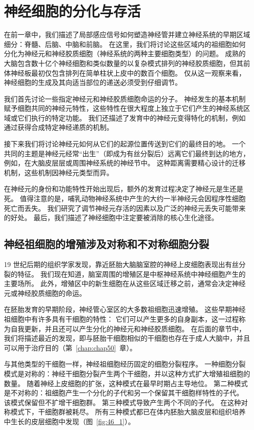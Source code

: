 \chapter{神经细胞的分化与存活} \label{chap:chap46}


在前一章中，我们描述了局部感应信号如何塑造神经管并建立神经系统的早期区域细分：脊髓、后脑、中脑和前脑。
在这里，我们将讨论这些区域内的祖细胞如何分化为神经元和神经胶质细胞（神经系统的两种主要细胞类型）的问题。
成熟的大脑包含数十亿个神经细胞和类似数量的以复杂模式排列的神经胶质细胞，但其前体神经板最初仅包含排列在简单柱状上皮中的数百个细胞。
仅从这一观察来看，神经细胞的生成及其向适当部位的递送必须受到仔细调节。


我们首先讨论一些指定神经元和神经胶质细胞命运的分子。
神经发生的基本机制赋予细胞共同的神经元特性，这些特性在很大程度上独立于它们产生的神经系统区域或它们执行的特定功能。
我们还描述了发育中的神经元变得特化的机制，例如通过获得合成特定神经递质的机制。


接下来我们将讨论神经元如何从它们的起源位置传送到它们的最终目的地。
一个共同的主题是神经元经常“出生”（即成为有丝分裂后）远离它们最终到达的地方，例如，在大脑皮层层或周围神经系统的神经节中。
这种距离需要精心设计的迁移机制，这些机制因神经元类型而异。




在神经元的身份和功能特性开始出现后，额外的发育过程决定了神经元是生还是死。
值得注意的是，哺乳动物神经系统中产生的大约一半神经元会因程序性细胞死亡而丢失。
我们研究了调节神经元存活的因素以及广泛的神经元丢失可能带来的好处。
最后，我们描述了神经细胞中注定要被消除的核心生化途径。



\section{神经祖细胞的增殖涉及对称和不对称细胞分裂}

19 世纪后期的组织学家发现，靠近胚胎大脑脑室腔的神经上皮细胞表现出有丝分裂的特征。
我们现在知道，脑室周围的增殖区是中枢神经系统中神经细胞产生的主要场所。
此外，增殖区中的新生细胞在从这些区域迁移之前，通常会决定神经元或神经胶质细胞的命运。


在胚胎发育的早期阶段，神经管心室区的大多数祖细胞迅速增殖。
这些早期神经祖细胞中有许多具有干细胞的特性：
它们可以产生更多的自身副本，这一过程称为自我更新，并且还可以产生分化的神经元和神经胶质细胞。
在后面的章节中，我们将描述最近的发现，即与胚胎干细胞相似的干细胞也存在于成人大脑中，并且可以用于治疗目的（第~\ref{chap:chap50}~章）。


与其他类型的干细胞一样，神经祖细胞经历固定的细胞分裂程序。
一种细胞分裂模式是对称的：神经干细胞分裂产生两个干细胞，并以这种方式扩大增殖祖细胞的数量。
随着神经上皮细胞的扩张，这种模式在最早时期占主导地位。
第二种模式是不对称的：祖细胞产生一个分化的子代和另一个保留其干细胞样特性的子代。
 该模式保留但不扩增干细胞群。
第三种模式导致产生两个不同的子代。
在这种对称模式下，干细胞群被耗尽。
所有三种模式都已在体内胚胎大脑皮层和组织培养中生长的皮层细胞中发现（图~\ref{fig:46_1}）。


